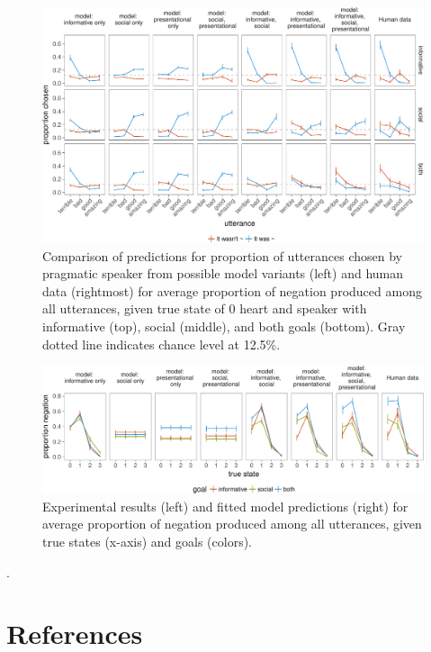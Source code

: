 \documentclass[floatsintext,man]{apa6}
\theoremstyle{definition}
\theoremstyle{definition}
\theoremstyle{definition}
\theoremstyle{remark}
\begin{document}
\begin{figure}[!h]
\includegraphics[width=\textwidth]{polite_manuscript_files/figure-latex/comparisonAll-1} \caption{Comparison of predictions for proportion of utterances chosen by pragmatic speaker from possible model variants (left) and human data (rightmost) for average proportion of negation produced among all utterances, given true state of 0 heart and speaker with informative (top), social (middle), and both goals (bottom). Gray dotted line indicates chance level at 12.5\%.}\label{fig:comparisonAll}
\end{figure}

\begin{figure}[!h]
\includegraphics[width=\textwidth]{polite_manuscript_files/figure-latex/negation-1} \caption{Experimental results (left) and fitted model predictions (right) for average proportion of negation produced among all utterances, given true states (x-axis) and goals (colors).}\label{fig:negation}
\end{figure}

.

\newpage

\newpage

\newpage

\pagebreak

\section{References}\label{references}
\end{document}
